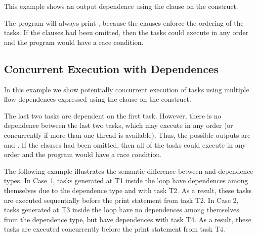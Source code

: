 This example shows an output dependence using the  
clause on the  construct.



The program will always print , because the  
clauses enforce the ordering of the tasks. If the  clauses had been 
omitted, then the tasks could execute in any order and the program would have a 
race condition.

\pagebreak
\subsection{Concurrent Execution with Dependences}
\label{subsec:task_concurrent_depend}

In this example we show potentially concurrent execution of tasks using multiple 
flow dependences expressed using the  clause on the  
construct.

The last two tasks are dependent on the first task. However, there is no dependence 
between the last two tasks, which may execute in any order (or concurrently if 
more than one thread is available). Thus, the possible outputs are 
 and . 
If the  clauses had been omitted, then all of the tasks could execute 
in any order and the program would have a race condition.



The following example illustrates the semantic difference between 
and  dependence types.  In Case 1, tasks generated at T1
inside the loop have dependences among themselves due to 
the  dependence type and with task T2.
As a result, these tasks are executed sequentially before the print
statement from task T2.
In Case 2, tasks generated at T3 inside the loop have no dependences
among themselves from the  dependence type, but have 
dependences with task T4.
As a result, these tasks are executed concurrently before the print
statement from task T4.




